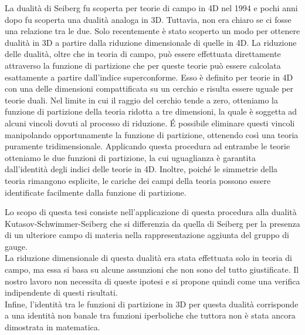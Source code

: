 \documentclass[a4paper,oneside,11pt]{article}
\begin{document}
La dualità di Seiberg fu scoperta per teorie di campo in 4D nel 1994 e pochi anni dopo fu scoperta una dualità analoga in 3D.
Tuttavia, non era chiaro se ci fosse una relazione tra le due.
Solo recentemente è stato scoperto un modo per ottenere dualità in 3D a partire dalla riduzione dimensionale di quelle in 4D.
La riduzione delle dualità, oltre che in teoria di campo, può essere effettuata direttamente attraverso la funzione di partizione che per queste teorie può essere calcolata esattamente a partire dall'indice superconforme.
Esso è definito per teorie in 4D con una delle dimensioni compattificata su un cerchio e risulta essere uguale per teorie duali.
Nel limite in cui il raggio del cerchio tende a zero, otteniamo la funzione di partizione della teoria ridotta a tre dimensioni, la quale è soggetta ad alcuni vincoli dovuti al processo di riduzione.
\'E possibile eliminare questi vincoli manipolando opportunamente la funzione di partizione, ottenendo così una teoria puramente tridimensionale. 
Applicando questa procedura ad entrambe le teorie otteniamo le due funzioni di partizione, la cui uguaglianza è garantita dall'identità degli indici delle teorie in 4D.
Inoltre, poiché le simmetrie della teoria rimangono esplicite, le cariche dei campi della teoria possono essere identificate facilmente dalla funzione di partizione.

Lo scopo di questa tesi consiste nell'applicazione di questa procedura alla dualità Kutasov-Schwimmer-Seiberg che si differenzia da quella di Seiberg per la presenza di un ulteriore campo di materia nella rappresentazione aggiunta del gruppo di gauge. \\
La riduzione dimensionale di questa dualità era stata effettuata solo in teoria di campo, ma essa si basa su alcune assunzioni che non sono del tutto giustificate.
Il nostro lavoro non necessita di queste ipotesi e si propone quindi come una verifica indipendente di questi risultati.
\\
Infine, l'identità tra le funzioni di partizione in 3D per questa dualità corrisponde a una identità non banale tra funzioni iperboliche che tuttora non è stata ancora dimostrata in matematica.
\end{document}
